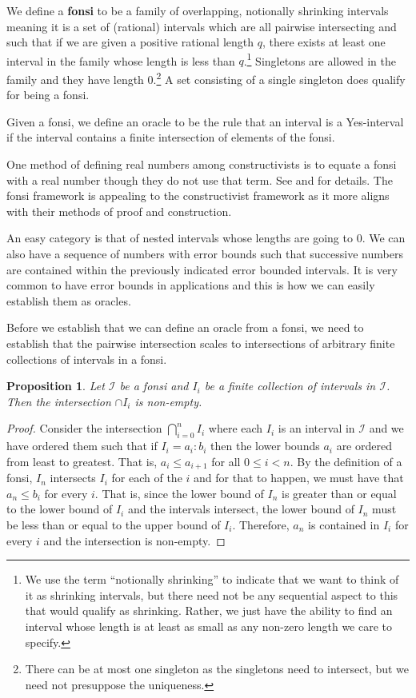 \documentclass[12pt]{article}
\newtheorem{proposition}{Proposition}[subsection]
\theoremstyle{remark}
\begin{document}
We define a \textbf{fonsi} to be a family of overlapping, notionally shrinking intervals meaning it is a set of (rational) intervals which are all pairwise intersecting and such that if we are given a positive rational length $q$, there exists at least one interval in the family whose length is less than $q$.\footnote{We use the term ``notionally shrinking'' to indicate that we want to think of it as shrinking intervals, but there need not be any sequential aspect to this that would qualify as shrinking. Rather, we just have the ability to find an interval whose length is at least as small as any non-zero length we care to specify.} Singletons are allowed in the family and they have length 0.\footnote{There can be at most one singleton as the singletons need to intersect, but we need not presuppose the uniqueness.} A set consisting of a single singleton does qualify for being a fonsi.

Given a fonsi, we define an oracle to be the rule that an interval is a Yes-interval if the interval contains a finite intersection of elements of the fonsi. 

One method of defining real numbers among constructivists is to equate a fonsi with a real number though they do not use that term. See \cite{bridger} and \cite{bridges} for details. The fonsi framework is appealing to the constructivist framework as it more aligns with their methods of proof and construction. 

An easy category is that of nested intervals whose lengths are going to 0. We can also have a sequence of numbers with error bounds such that successive numbers are contained within the previously indicated error bounded intervals.  It is very common to have error bounds in applications and this is how we can easily establish them as oracles. 

Before we establish that we can define an oracle from a fonsi, we need to establish that the pairwise intersection scales to intersections of arbitrary finite collections of  intervals in a fonsi. 

\begin{proposition}
 Let $\mathcal{I}$ be a fonsi and $I_i$ be a finite collection of intervals in $\mathcal{I}$. Then the intersection $\cap I_i$ is non-empty.
\end{proposition}

\begin{proof} 
    Consider the intersection $\bigcap_{i=0}^n I_i$ where each $I_i$ is an interval in $\mathcal{I}$ and we have ordered them such that if $I_i = a_i : b_i$ then the lower bounds $a_i$ are ordered from least to greatest. That is,  $a_i \leq a_{i+1}$ for all $0 \leq i < n$. By the definition of a fonsi, $I_n$ intersects $I_i$ for each of the $i$ and for that to happen, we must have that $a_n \leq b_i$ for every $i$. That is, since the lower bound of $I_n$ is greater than or equal to the lower bound of $I_i$ and the intervals intersect, the lower bound of $I_n$ must be less than or equal to the upper bound of $I_i$. Therefore, $a_n$ is contained in $I_i$ for every $i$ and the intersection is non-empty. 
\end{proof}
\end{document}
